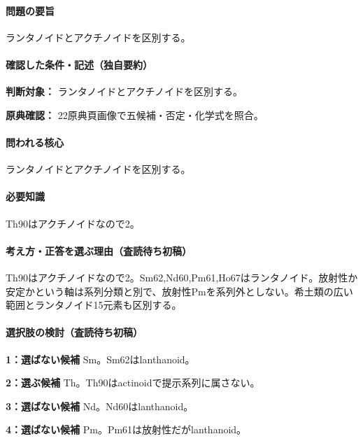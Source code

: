 \paragraph{問題の要旨} ランタノイドとアクチノイドを区別する。

\paragraph{確認した条件・記述（独自要約）}\mbox{}\par

\noindent\textbf{判断対象：} ランタノイドとアクチノイドを区別する。\par

\noindent\textbf{原典確認：} 22原典頁画像で五候補・否定・化学式を照合。\par

\paragraph{問われる核心} ランタノイドとアクチノイドを区別する。

\paragraph{必要知識} Th90はアクチノイドなので2。

\paragraph{考え方・正答を選ぶ理由（査読待ち初稿）} Th90はアクチノイドなので2。Sm62,Nd60,Pm61,Ho67はランタノイド。放射性か安定かという軸は系列分類と別で、放射性Pmを系列外としない。希土類の広い範囲とランタノイド15元素も区別する。

\paragraph{選択肢の検討（査読待ち初稿）}\mbox{}\par

\noindent\textbf{1：選ばない候補} Sm。Sm62はlanthanoid。\par

\noindent\textbf{2：選ぶ候補} Th。Th90はactinoidで提示系列に属さない。\par

\noindent\textbf{3：選ばない候補} Nd。Nd60はlanthanoid。\par

\noindent\textbf{4：選ばない候補} Pm。Pm61は放射性だがlanthanoid。\par

